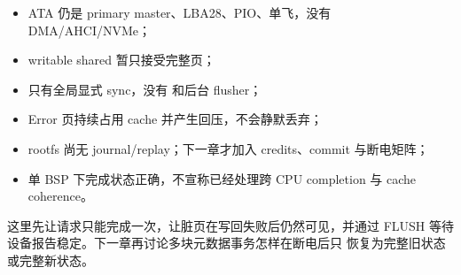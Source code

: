 \par
\begin{itemize}
  \item ATA 仍是 primary master、LBA28、PIO、单飞，没有 DMA/AHCI/NVMe；
  \item writable shared 暂只接受完整页；
  \item 只有全局显式 sync，没有  和后台 flusher；
  \item Error 页持续占用 cache 并产生回压，不会静默丢弃；
  \item rootfs 尚无 journal/replay；下一章才加入 credits、commit 与断电矩阵；
  \item 单 BSP 下完成状态正确，不宣称已经处理跨 CPU completion 与 cache coherence。
\end{itemize}

这里先让请求只能完成一次，让脏页在写回失败后仍然可见，并通过 FLUSH 等待
设备报告稳定。下一章再讨论多块元数据事务怎样在断电后只
恢复为完整旧状态或完整新状态。
